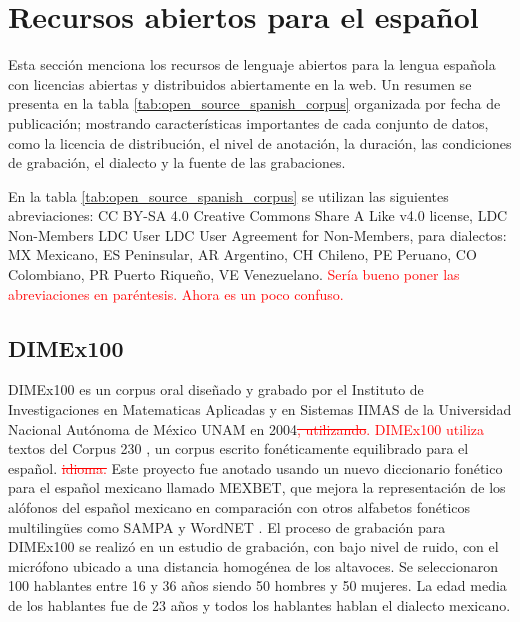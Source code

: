 \documentclass[a4paper,12pt,twoside]{report}
\newcommand{\macb}{\textcolor{red}}
\begin{document}




\section{Recursos abiertos para el español}

Esta sección menciona los recursos de lenguaje abiertos para la lengua española con licencias abiertas y distribuidos abiertamente en la web. Un resumen se presenta en la tabla \ref{tab:open_source_spanish_corpus} organizada por fecha de publicación; mostrando características importantes de cada conjunto de datos, como la licencia de distribución, el nivel de anotación, la duración, las condiciones de grabación, el dialecto y la fuente de las grabaciones.

En la tabla \ref{tab:open_source_spanish_corpus} se utilizan las siguientes abreviaciones:  CC BY-SA 4.0 Creative Commons Share A Like v4.0 license, LDC Non-Members LDC User LDC User Agreement for Non-Members, para dialectos: MX Mexicano, ES Peninsular, AR Argentino, CH Chileno, PE Peruano, CO Colombiano, PR Puerto Riqueño, VE Venezuelano. \macb{Ser\'ia bueno poner las abreviaciones en par\'entesis. Ahora es un poco confuso.}



\subsection{DIMEx100}

DIMEx100 es un corpus oral diseñado y grabado por el Instituto de Investigaciones en Matematicas Aplicadas y en Sistemas IIMAS de la Universidad Nacional Autónoma de México UNAM en 2004\macb{\st{, utilizando}. DIMEx100 utiliza} textos del Corpus 230 \cite{Corpus230}, un corpus escrito fonéticamente equilibrado para el español. \macb{\st{idioma.}} Este proyecto fue anotado usando un nuevo diccionario fonético para el español mexicano llamado MEXBET, que mejora la representación de los alófonos del español mexicano en comparación con otros alfabetos fonéticos multilingües como SAMPA y WordNET \cite{mexbet}. El proceso de grabación para DIMEx100 se realizó en un estudio de grabación, con bajo nivel de ruido, con el micrófono ubicado a una distancia homogénea de los altavoces. Se seleccionaron 100 hablantes entre 16 y 36 años siendo 50 hombres y 50 mujeres. La edad media de los hablantes fue de 23 años y todos los hablantes hablan el dialecto mexicano.
\end{document}

